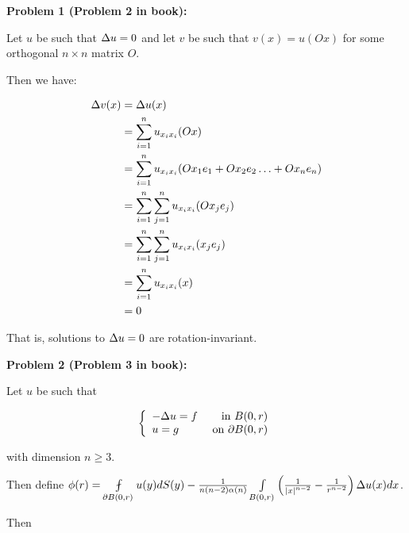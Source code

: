 \documentclass[a4paper,12pt]{article}
\begin{document}
{\bf Problem 1 (Problem 2 in book):}

Let $u$ be such that $\Delta u = 0$ and let $v$ be such that $v(x) = u(Ox)$ for some orthogonal $n\times n$  matrix $O$.

Then we have:

\begin{align*}
\Delta v(x) &= \Delta u(x)\\
&= \sum\limits_{i=1}^n u_{x_ix_i} (Ox)\\
&= \sum\limits_{i=1}^n u_{x_ix_i} (Ox_1e_1+ Ox_2e_2 \ldots + Ox_ne_n)\\
&= \sum\limits_{i=1}^n \sum\limits_{j=1}^n u_{x_ix_i} (Ox_je_j) \\
&= \sum\limits_{i=1}^n \sum\limits_{j=1}^n u_{x_ix_i} (x_je_j) \\
&= \sum\limits_{i=1}^n u_{x_ix_i} (x)\\
&= 0
\end{align*}

That is, solutions to $\Delta u = 0$ are rotation-invariant.

\shunt

{\bf Problem 2 (Problem 3 in book):}

Let $u$ be such that 

\begin{displaymath}
   \left\{
     \begin{array}{lr}
       -\Delta u = f & \text{ in } B(0,r)\\
       u=g & \text{ on }\partial B(0,r)
     \end{array}
   \right.
\end{displaymath} 

with dimension $n \geq 3$.

Then define $\phi(r) = \fint\limits_{\partial B(0,r)} u(y) dS(y) - \frac{1}{n(n-2)\al(n)} \int\limits_{B(0,r)} \left(\frac{1}{\absval{x}^{n-2}} - \frac{1}{r^{n-2}}\right) \De u(x) dx$.

Then 
\end{document}
